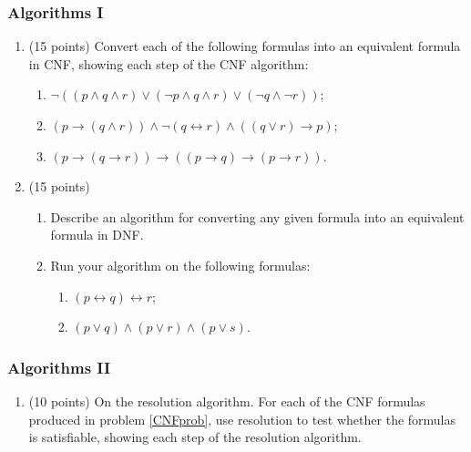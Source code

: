 \documentclass[english]{article}
\theoremstyle{definition}
\begin{document}
	\subsubsection{Algorithms I}
	\begin{enumerate}[label=\arabic*.,ref=\arabic*,resume]
		\item\label{CNFprob} (15 points) Convert each of the following formulas into an equivalent formula in CNF, showing each step of the CNF algorithm:
		\begin{enumerate}
			\item $\neg((p\land q\land r)\lor (\neg p\land q\land r)\lor (\neg q\land \neg r))$;
			\item $(p\to (q\land r))\land \neg (q\leftrightarrow r)\land ((q\lor r)\to p)$;
			\item $(p\to(q\to r))\to((p\to q)\to(p\to r))$.
		\end{enumerate}
		\item (15 points)
		\begin{enumerate}
			\item Describe an algorithm for converting any given formula into an equivalent formula in DNF. 
			\item Run your algorithm on the following formulas:
			\begin{enumerate}
				\item $(p\leftrightarrow q)\leftrightarrow r$;
				\item $(p\lor q)\land (p\lor r)\land (p\lor s)$.
			\end{enumerate}
		\end{enumerate}
	\end{enumerate}
	
	\subsubsection{Algorithms II}
	
	\begin{enumerate}[label=\arabic*.,ref=\arabic*,resume]
		\item (10 points) On the resolution algorithm. For each of the CNF formulas produced in problem \ref{CNFprob}, use resolution  to test whether the formulas is satisfiable, showing each step of the resolution algorithm.
	\end{enumerate}
	
\end{document}
